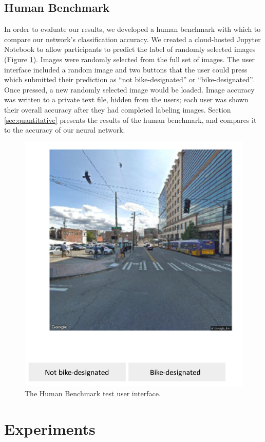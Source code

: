 \documentclass[10pt,twocolumn,letterpaper]{article}
\begin{document}
\subsection{Human Benchmark}
In order to evaluate our results, we developed a human benchmark with which to compare our network's classification accuracy. We created a cloud-hosted Jupyter Notebook to allow participants to predict the label of randomly selected images (Figure \ref{fig:ui}). Images were randomly selected from the full set of images. The user interface included a random image and two buttons that the user could press which submitted their prediction as ``not bike-designated'' or ``bike-designated''. Once pressed, a new randomly selected image would be loaded. Image accuracy was written to a private text file, hidden from the users; each user was shown their overall accuracy after they had completed labeling images. Section \ref{sec:quantitative} presents the results of the human benchmark, and compares it to the accuracy of our neural network.

\begin{figure}[t]
\begin{center}
	\includegraphics[width=.7\linewidth]{gui_2.png}
\end{center}
	\caption{The Human Benchmark test user interface.}
\label{fig:ui}
\end{figure}

\section{Experiments}
\label{sec:experiments}
\end{document}
